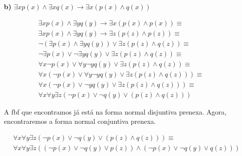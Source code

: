 \textbf{b) $\exists x p(x) \land \exists x q(x) \rightarrow \exists x (p(x) \land q(x)) $}

\begin{align*}
\exists x p(x) \land \exists y q(y) \rightarrow \exists x (p(x) \land p(x)) \equiv \\
\exists x p(x) \land \exists y q(y) \rightarrow \exists z (p(z) \land p(z)) \equiv && \tag*{Renom.}   \\
\lnot (\exists p (x) \land \exists y q(y)) \lor \exists z (p(z) \land q(z))  \equiv  && \tag*{Rem. $\rightarrow$}\\
\lnot \exists p (x) \lor \lnot \exists y q(y) \lor \exists z (p(z) \land q(z)) \equiv  \\
\forall x \lnot p (x) \lor \forall y \lnot y q(y) \lor \exists z (p(z) \land q(z)) \equiv  \\
\forall x (\lnot p (x) \lor \forall y \lnot y q(y) \lor \exists z (p(z) \land q(z))) \equiv  \\
\forall x (\lnot p (x) \lor \lnot y q(y) \lor \exists z (p(z) \land q(z)))  \equiv \\
\forall x \forall y \exists z (\lnot p (x) \lor \lnot q(y) \lor (p(z) \land q(z)))
\end{align*}

A fbf que encontramos já está na forma normal disjuntiva prenexa.
Agora, encontraremos a forma normal conjuntiva prenexa.

\begin{align*}
\forall x \forall y \exists z (\lnot p (x) \lor \lnot q(y) \lor (p(z) \land q(z))) \equiv \\
\forall x \forall y \exists z ((\lnot p(x) \lor \lnot q(y) \lor p(z)) \land (\lnot p(x) \lor \lnot q(y) \lor q(z)))
\end{align*}